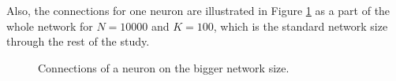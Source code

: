 \documentclass[a4paper,12pt]{article}
\begin{document}
Also, the connections for one neuron are illustrated in Figure \ref{neuron_network} as a part of the whole network for $N=10000$ and $K=100$, which is the standard network size through the rest of the study.

\begin{figure}[H] 
    \caption{Connections of a neuron on the bigger network size.}
    \label{neuron_network}
\end{figure}
\end{document}
